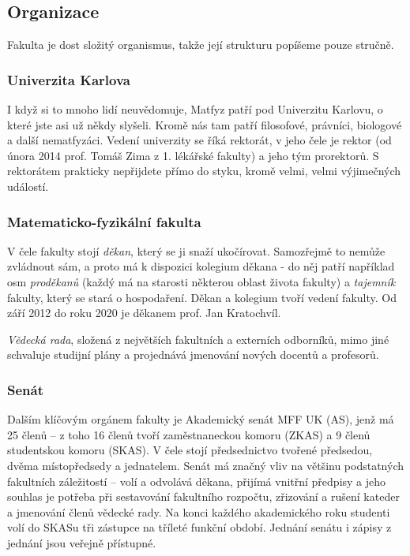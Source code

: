 \subsection{Organizace}
Fakulta je dost složitý organismus,
takže její strukturu popíšeme pouze stručně.


\subsubsection{Univerzita Karlova}
I když si to mnoho lidí neuvědomuje, Matfyz patří pod Univerzitu Karlovu, o
které jste asi už někdy slyšeli. Kromě nás tam patří filosofové, právníci,
biologové a další nematfyzáci. Vedení univerzity se říká rektorát, v jeho čele
je rektor (od února 2014 prof. Tomáš Zima z 1. lékářské fakulty) a jeho tým
prorektorů. S rektorátem prakticky nepřijdete přímo do styku, kromě velmi,
velmi výjimečných událostí.


\subsubsection{Matematicko-fyzikální fakulta}
V čele fakulty stojí \textit{děkan}, který se ji snaží ukočírovat.
Samozřejmě to nemůže zvládnout sám, a proto má k dispozici kolegium
děkana - do něj patří například osm \textit{proděkanů}
(každý má na starosti některou oblast života fakulty) a \textit{tajemník}
fakulty, který se stará o hospodaření. Děkan a kolegium tvoří vedení fakulty.
Od září 2012 do roku 2020 je děkanem prof. Jan Kratochvíl.

\textit{Vědecká rada}, složená z největších fakultních a externích odborníků, mimo
jiné schvaluje studijní plány a projednává jmenování nových docentů a profesorů.


\subsubsection{Senát}
Dalším klíčovým orgánem fakulty je Akademický senát MFF UK (AS),
jenž má 25 členů – z toho 16 členů tvoří zaměstnaneckou komoru (ZKAS)
a 9 členů studentskou komoru (SKAS). V čele stojí předsednictvo tvořené předsedou,
dvěma místopředsedy a jednatelem. Senát má značný vliv na většinu podstatných
fakultních záležitostí – volí a odvolává děkana, přijímá vnitřní předpisy a
jeho souhlas je potřeba při sestavování fakultního rozpočtu, zřizování a
rušení kateder a jmenování členů vědecké rady.
Na konci každého akademického roku studenti volí do SKASu tři zástupce na
tříleté funkční období. Jednání senátu i zápisy z jednání jsou veřejně přístupné.

